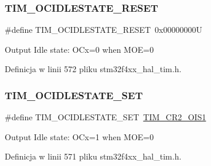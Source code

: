 \subsubsection{\texorpdfstring{T\+I\+M\+\_\+\+O\+C\+I\+D\+L\+E\+S\+T\+A\+T\+E\+\_\+\+R\+E\+S\+ET}{TIM\_OCIDLESTATE\_RESET}}
{\footnotesize\ttfamily \#define T\+I\+M\+\_\+\+O\+C\+I\+D\+L\+E\+S\+T\+A\+T\+E\+\_\+\+R\+E\+S\+ET~0x00000000U}

Output Idle state\+: O\+Cx=0 when M\+OE=0 

Definicja w linii 572 pliku stm32f4xx\+\_\+hal\+\_\+tim.\+h.

\mbox{\label{group___t_i_m___output___compare___idle___state_gad251b83b0e33ddd0ed2fb35aa747ef78}} 
\subsubsection{\texorpdfstring{T\+I\+M\+\_\+\+O\+C\+I\+D\+L\+E\+S\+T\+A\+T\+E\+\_\+\+S\+ET}{TIM\_OCIDLESTATE\_SET}}
{\footnotesize\ttfamily \#define T\+I\+M\+\_\+\+O\+C\+I\+D\+L\+E\+S\+T\+A\+T\+E\+\_\+\+S\+ET~\hyperlink{group___peripheral___registers___bits___definition_ga31b26bf058f88d771c33aff85ec89358}{T\+I\+M\+\_\+\+C\+R2\+\_\+\+O\+I\+S1}}

Output Idle state\+: O\+Cx=1 when M\+OE=0 

Definicja w linii 571 pliku stm32f4xx\+\_\+hal\+\_\+tim.\+h.

